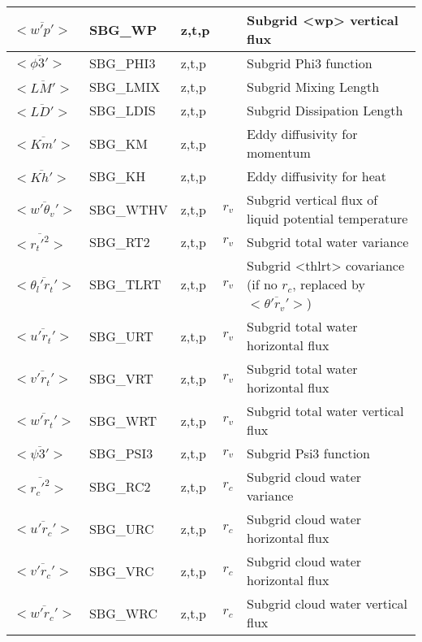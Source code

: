 \begin{longtable}[c]{|p{}|p{}|p{}|p{}|p{}|}
$<\overline{w'p'}>$                          & SBG\_WP   & z,t,p   &        & Subgrid <wp> vertical flux \\\hline
$<\overline{\phi3'}>$                        & SBG\_PHI3 & z,t,p   &        & Subgrid Phi3 function \\\hline
$<\overline{LM'}>$                           & SBG\_LMIX & z,t,p   &        & Subgrid Mixing Length \\\hline
$<\overline{LD'}>$                           & SBG\_LDIS & z,t,p   &        & Subgrid Dissipation Length \\\hline
$<\overline{Km'}>$                           & SBG\_KM   & z,t,p   &        & Eddy diffusivity for momentum \\\hline
$<\overline{Kh'}>$                           & SBG\_KH   & z,t,p   &        & Eddy diffusivity for heat \\\hline
$<\overline{w'\theta_v'}>$                   & SBG\_WTHV & z,t,p   & $r_v$  & Subgrid vertical flux of liquid potential temperature \\\hline
$<\overline{r_t'^2}>$                        & SBG\_RT2  & z,t,p   & $r_v$  & Subgrid total water variance \\\hline
$<\overline{\theta_l'r_t'}>$                 & SBG\_TLRT & z,t,p   & $r_v$  & Subgrid <thlrt> covariance (if no $r_c$, replaced by $<\overline{\theta'r_v'}>$) \\\hline
$<\overline{u'r_t'}>$                        & SBG\_URT  & z,t,p   & $r_v$  & Subgrid total water horizontal flux \\\hline
$<\overline{v'r_t'}>$                        & SBG\_VRT  & z,t,p   & $r_v$  & Subgrid total water horizontal flux \\\hline
$<\overline{w'r_t'}>$                        & SBG\_WRT  & z,t,p   & $r_v$  & Subgrid total water vertical flux \\\hline
$<\overline{\psi3'}>$                        & SBG\_PSI3 & z,t,p   & $r_v$  & Subgrid Psi3 function \\\hline
$<\overline{r_c'^2}>$                        & SBG\_RC2  & z,t,p   & $r_c$  & Subgrid cloud water variance \\\hline
$<\overline{u'r_c'}>$                        & SBG\_URC  & z,t,p   & $r_c$  & Subgrid cloud water horizontal flux \\\hline
$<\overline{v'r_c'}>$                        & SBG\_VRC  & z,t,p   & $r_c$  & Subgrid cloud water horizontal flux \\\hline
$<\overline{w'r_c'}>$                        & SBG\_WRC  & z,t,p   & $r_c$  & Subgrid cloud water vertical flux \\\hline

\end{longtable}
